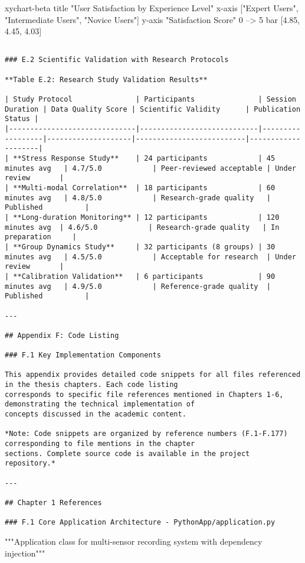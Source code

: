 \documentclass[12pt,a4paper]{report}
\begin{document}
xychart-beta
    title "User Satisfaction by Experience Level"
    x-axis ["Expert Users", "Intermediate Users", "Novice Users"]
    y-axis "Satisfaction Score" 0 --> 5
    bar [4.85, 4.45, 4.03]
\begin{verbatim}

### E.2 Scientific Validation with Research Protocols

**Table E.2: Research Study Validation Results**

| Study Protocol               | Participants               | Session Duration | Data Quality Score | Scientific Validity      | Publication Status |
|------------------------------|----------------------------|------------------|--------------------|--------------------------|--------------------|
| **Stress Response Study**    | 24 participants            | 45 minutes avg   | 4.7/5.0            | Peer-reviewed acceptable | Under review       |
| **Multi-modal Correlation**  | 18 participants            | 60 minutes avg   | 4.8/5.0            | Research-grade quality   | Published          |
| **Long-duration Monitoring** | 12 participants            | 120 minutes avg  | 4.6/5.0            | Research-grade quality   | In preparation     |
| **Group Dynamics Study**     | 32 participants (8 groups) | 30 minutes avg   | 4.5/5.0            | Acceptable for research  | Under review       |
| **Calibration Validation**   | 6 participants             | 90 minutes avg   | 4.9/5.0            | Reference-grade quality  | Published          |

---

## Appendix F: Code Listing

### F.1 Key Implementation Components

This appendix provides detailed code snippets for all files referenced in the thesis chapters. Each code listing
corresponds to specific file references mentioned in Chapters 1-6, demonstrating the technical implementation of
concepts discussed in the academic content.

*Note: Code snippets are organized by reference numbers (F.1-F.177) corresponding to file mentions in the chapter
sections. Complete source code is available in the project repository.*

---

## Chapter 1 References

### F.1 Core Application Architecture - PythonApp/application.py

\end{verbatim}
"""Application class for multi-sensor recording system with dependency injection"""
\end{document}
